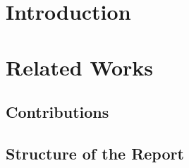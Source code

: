 \chapter{Introduction}
\label{cap:intro}
\lhead{\textbf{\rightmark}}

\indent{}

\chapter{Related Works}
\label{cap:releated works}
\lhead{\textbf{\rightmark}}

\section{Contributions}
\label{sec:contributions}

\section{Structure of the Report}
\label{sec:report_structure}